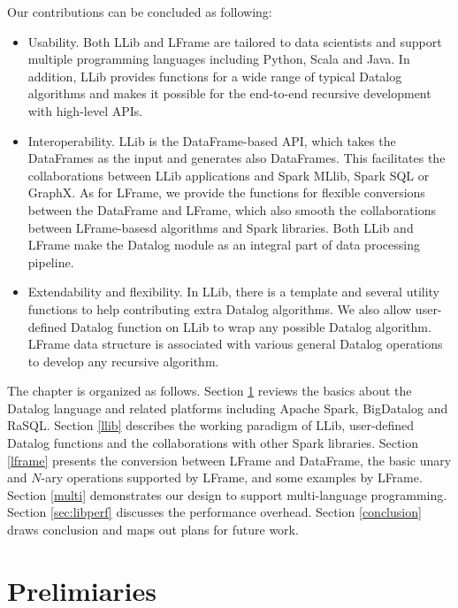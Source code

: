 Our contributions can be concluded as following:
\begin{itemize}
	
	\item Usability. Both LLib and LFrame are tailored to data scientists and support multiple programming languages including Python, Scala and Java. In addition, LLib  provides functions for a wide range of typical Datalog algorithms and makes it possible for the end-to-end  recursive development  with high-level APIs.
	\item Interoperability. LLib is the DataFrame-based API, which takes the DataFrames as the input and generates also DataFrames. This facilitates the collaborations between LLib applications and Spark MLlib, Spark SQL or GraphX. As for LFrame, we provide the functions for flexible conversions between the  DataFrame and LFrame, which also smooth the collaborations between LFrame-basesd algorithms and Spark libraries. Both LLib and LFrame make the Datalog module as an integral part of data processing pipeline. 
	\item Extendability and flexibility. In LLib, there is a template and several utility functions to help  contributing extra Datalog algorithms. We also allow user-defined Datalog function on LLib to wrap any possible Datalog algorithm.  LFrame data structure is associated with various general Datalog operations to develop any recursive algorithm.
\end{itemize}
The chapter is organized as follows. Section \ref{pre} reviews the basics about the Datalog language and related platforms including Apache Spark, BigDatalog and RaSQL. Section \ref{llib} describes the working paradigm of LLib,  
user-defined Datalog functions and the collaborations with other Spark libraries. 
Section \ref{lframe} presents the conversion between LFrame and DataFrame, the basic unary and $N$-ary operations supported by LFrame, and some examples by LFrame. Section \ref{multi} demonstrates our design to support multi-language programming. Section \ref{sec:libperf} discusses the performance overhead. Section \ref{conclusion} draws  conclusion and maps out plans for future work.

\section{Prelimiaries}
\label{pre}
